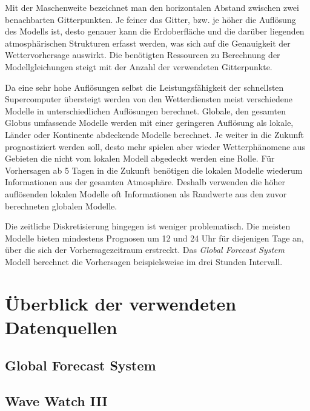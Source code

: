 Mit der Maschenweite bezeichnet man den horizontalen Abstand zwischen
zwei benachbarten Gitterpunkten. Je feiner das Gitter, bzw. je höher
die Auflösung des Modells ist, desto genauer kann die Erdoberfläche
und die darüber liegenden atmosphärischen Strukturen erfasst werden,
was sich auf die Genauigkeit der Wettervorhersage auswirkt. Die
benötigten Ressourcen zu Berechnung der Modellgleichungen steigt mit
der Anzahl der verwendeten Gitterpunkte.

Da eine sehr hohe Auflösungen selbst die Leistungsfähigkeit der
schnellsten Supercomputer übersteigt werden von den Wetterdiensten
meist verschiedene Modelle in unterschiedlichen Auflösungen
berechnet. Globale, den gesamten Globus umfassende Modelle werden mit
einer geringeren Auflösung als lokale, Länder oder Kontinente
abdeckende Modelle berechnet. Je weiter in die Zukunft prognostiziert
werden soll, desto mehr spielen aber wieder Wetterphänomene aus
Gebieten die nicht vom lokalen Modell abgedeckt werden eine Rolle. Für
Vorhersagen ab 5 Tagen in die Zukunft benötigen die lokalen Modelle
wiederum Informationen aus der gesamten Atmosphäre. Deshalb verwenden
die höher auflösenden lokalen Modelle oft Informationen als Randwerte
aus den zuvor berechneten globalen Modelle.

Die zeitliche Diskretisierung hingegen ist weniger problematisch. Die
meisten Modelle bieten mindestens Prognosen um 12 und 24 Uhr für
diejenigen Tage an, über die sich der Vorhersagezeitraum
erstreckt. Das \textit{Global Forecast System} Modell berechnet die
Vorhersagen beispielsweise im drei Stunden Intervall.

\section{Überblick der verwendeten Datenquellen}

\subsection{Global Forecast System}
\subsection{Wave Watch III}





